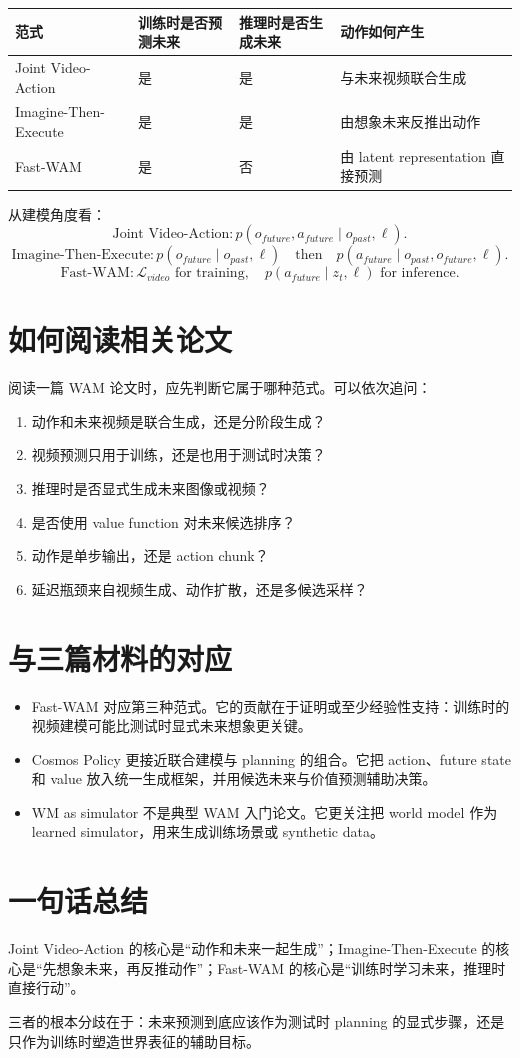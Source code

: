 \documentclass[11pt,a4paper]{ctexart}
\begin{document}
\begin{center}
\begin{tabular}{llll}
\toprule
范式 & 训练时是否预测未来 & 推理时是否生成未来 & 动作如何产生 \\
\midrule
Joint Video-Action & 是 & 是 & 与未来视频联合生成 \\
Imagine-Then-Execute & 是 & 是 & 由想象未来反推出动作 \\
Fast-WAM & 是 & 否 & 由 latent representation 直接预测 \\
\bottomrule
\end{tabular}
\end{center}

从建模角度看：
\[
  \text{Joint Video-Action}
  :
  p(o_{future},a_{future}\mid o_{past},\ell).
\]
\[
  \text{Imagine-Then-Execute}
  :
  p(o_{future}\mid o_{past},\ell)
  \quad \text{then} \quad
  p(a_{future}\mid o_{past},o_{future},\ell).
\]
\[
  \text{Fast-WAM}
  :
  \mathcal{L}_{video}\text{ for training},
  \quad
  p(a_{future}\mid z_t,\ell)\text{ for inference}.
\]

\section{如何阅读相关论文}

阅读一篇 WAM 论文时，应先判断它属于哪种范式。可以依次追问：
\begin{enumerate}
  \item 动作和未来视频是联合生成，还是分阶段生成？
  \item 视频预测只用于训练，还是也用于测试时决策？
  \item 推理时是否显式生成未来图像或视频？
  \item 是否使用 value function 对未来候选排序？
  \item 动作是单步输出，还是 action chunk？
  \item 延迟瓶颈来自视频生成、动作扩散，还是多候选采样？
\end{enumerate}

\section{与三篇材料的对应}

\begin{itemize}
  \item Fast-WAM 对应第三种范式。它的贡献在于证明或至少经验性支持：训练时的视频建模可能比测试时显式未来想象更关键。
  \item Cosmos Policy 更接近联合建模与 planning 的组合。它把 action、future state 和 value 放入统一生成框架，并用候选未来与价值预测辅助决策。
  \item WM as simulator 不是典型 WAM 入门论文。它更关注把 world model 作为 learned simulator，用来生成训练场景或 synthetic data。
\end{itemize}

\section{一句话总结}

Joint Video-Action 的核心是“动作和未来一起生成”；Imagine-Then-Execute 的核心是“先想象未来，再反推动作”；Fast-WAM 的核心是“训练时学习未来，推理时直接行动”。

三者的根本分歧在于：未来预测到底应该作为测试时 planning 的显式步骤，还是只作为训练时塑造世界表征的辅助目标。
\end{document}

